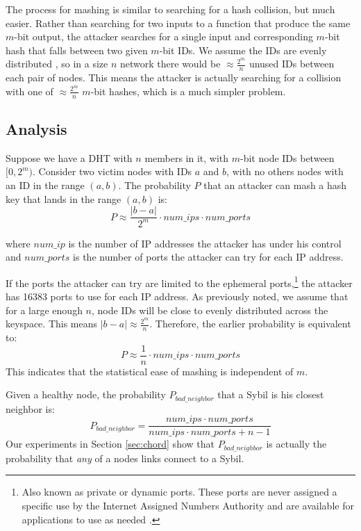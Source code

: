 \documentclass[11pt,conference]{IEEEtran}
\begin{document}
The process for mashing is similar to searching for a hash collision, but much easier.
Rather than searching for two inputs to a function that produce the same $m$-bit output, the attacker searches for a single input and corresponding $m$-bit hash that falls between two given $m$-bit IDs.
We assume the IDs are evenly distributed \cite{bellare2004hash}, so in a size $n$ network there would be $\approx \frac{2^{m}}{n}$ unused IDs between each pair of nodes.
This means the attacker is actually searching for a collision with one of $\approx \frac{2^{m}}{n}$ $m$-bit hashes, which is a much simpler problem.

\subsection{Analysis}
Suppose we have a DHT with $n$ members in it, with $m$-bit node IDs between $[0,2^{m})$. 
Consider two victim nodes with IDs $a$ and $b$, with no others nodes with an ID in the range $(a,b)$.
The probability $P$ that an attacker can mash a hash key that lands in the range $(a,b)$ is:
$$ P \approx \frac{|b-a|}{2^{m}}\cdot num\_ips \cdot num\_ports  $$

where $num\_ip$ is the number of IP addresses the attacker has under his control and $num\_ports$ is the number of ports the attacker can try for each IP address.

If the ports the attacker can try are limited to the ephemeral ports,\footnote{Also known as private or dynamic ports.  These ports are never assigned a specific use by the Internet Assigned Numbers Authority  and are available for applications to use as needed \cite{cotton2011internet}.} the attacker has 16383 ports to use for each IP address.
As previously noted, we assume that for a large enough $n$, node IDs will be close to evenly distributed across the keyspace.
This means $|b-a| \approx \frac{2^{m}}{n}$.
Therefore, the earlier probability is equivalent to:
$$ P \approx \frac{1}{n}\cdot num\_ips \cdot num\_ports  $$
This indicates that the statistical ease of mashing is independent of $m$.


Given a healthy node, the probability $P_{bad\_neighbor}$ that a Sybil is his closest neighbor is:
\begin{equation}
P_{bad\_neighbor} =  \frac{num\_ips \cdot num\_ports}{num\_ips \cdot num\_ports + n - 1}
\label{eq:bad}
\end{equation}
Our experiments in Section \ref{sec:chord} show that $P_{bad\_neighbor}$ is actually the probability that \textit{any} of a nodes links connect to a Sybil.
\end{document}
